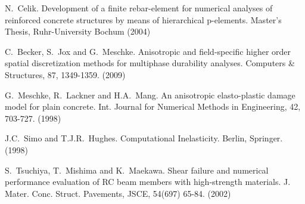 
\begin{thebibliography}{10}
{\sc N.~Celik}. {Development of a finite rebar-element for numerical analyses of reinforced concrete structures by means of hierarchical p-elements}. Master's Thesis, Ruhr-University Bochum (2004)

{\sc C.~Becker, S.~Jox and G.~Meschke}. {Anisotropic and field-specific higher order spatial discretization methods for multiphase durability analyses}. Computers \& Structures, 87, 1349-1359. (2009)

{\sc G.~Meschke, R.~Lackner and H.A.~Mang}. {An anisotropic elasto-plastic damage model for plain concrete}. Int. Journal for Numerical Methods in Engineering, 42, 703-727. (1998)

{\sc J.C.~Simo and T.J.R.~Hughes}. {Computational Inelasticity}. Berlin, Springer. (1998)

{\sc S.~Tsuchiya, T.~Mishima and K.~Maekawa}. {Shear failure and numerical performance evaluation of RC beam members with high-strength materials}. J. Mater. Conc. Struct. Pavements, JSCE, 54(697) 65-84. (2002)
 \end{thebibliography}
